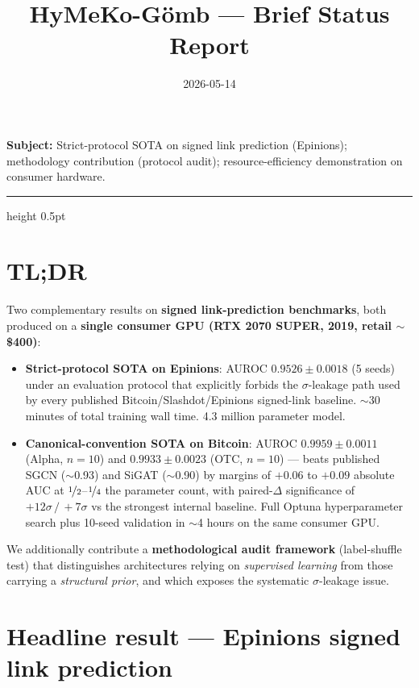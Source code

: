 \documentclass[11pt,a4paper]{article}
\title{\textbf{HyMeKo-G\"omb} — Brief Status Report}
\date{2026-05-14}
\author{}
\newcommand{\sig}{\ensuremath{\sigma}}
\newcommand{\pmval}[2]{\ensuremath{#1 \pm #2}}
\begin{document}
\maketitle
\thispagestyle{fancy}

\noindent\textbf{Subject:} Strict-protocol SOTA on signed link
prediction (Epinions); methodology contribution (protocol audit);
resource-efficiency demonstration on consumer hardware.

\hrule height 0.5pt
\vspace{0.5em}

\section*{TL;DR}

Two complementary results on \textbf{signed link-prediction benchmarks},
both produced on a \textbf{single consumer GPU (RTX 2070 SUPER, 2019,
retail $\sim$\$400)}:

\begin{itemize}
  \item \textbf{Strict-protocol SOTA on Epinions}: AUROC
    \pmval{0.9526}{0.0018} (5 seeds) under an evaluation protocol
    that explicitly forbids the \sig-leakage path used by every
    published Bitcoin/Slashdot/Epinions signed-link baseline.
    $\sim$30 minutes of total training wall time. 4.3 million
    parameter model.
  \item \textbf{Canonical-convention SOTA on Bitcoin}: AUROC
    \pmval{0.9959}{0.0011} (Alpha, $n{=}10$) and \pmval{0.9933}{0.0023}
    (OTC, $n{=}10$) --- beats published SGCN ($\sim$0.93) and SiGAT
    ($\sim$0.90) by margins of $+0.06$ to $+0.09$ absolute AUC at
    $\nicefrac{1}{2}$--$\nicefrac{1}{4}$ the parameter count, with
    paired-$\Delta$ significance of $+12\sig\,/\,+7\sig$ vs the
    strongest internal baseline. Full Optuna hyperparameter search
    plus 10-seed validation in $\sim$4 hours on the same consumer GPU.
\end{itemize}

We additionally contribute a \textbf{methodological audit framework}
(label-shuffle test) that distinguishes architectures relying on
\emph{supervised learning} from those carrying a \emph{structural
prior}, and which exposes the systematic \sig-leakage issue.

\section{Headline result — Epinions signed link prediction}
\end{document}

